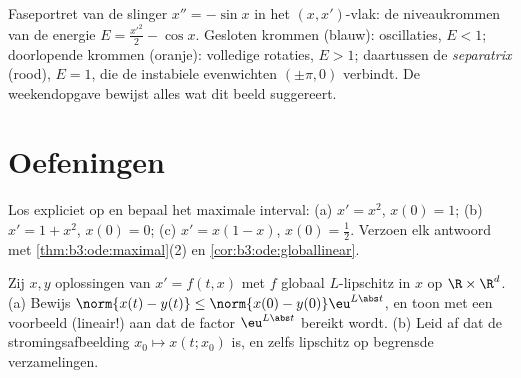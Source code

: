 \begin{omfigure}

{\small Faseportret van de slinger $x'' = -\sin x$ in het
$(x, x')$-vlak: de niveaukrommen van de energie $E = \frac{x'^2}2
- \cos x$. Gesloten krommen (blauw): oscillaties, $E < 1$;
doorlopende krommen (oranje): volledige rotaties, $E > 1$;
daartussen de \emph{separatrix} (rood), $E = 1$, die de
instabiele evenwichten $(\pm\pi, 0)$ verbindt. De weekendopgave
bewijst alles wat dit beeld suggereert.}
\end{omfigure}

\section{Oefeningen}

\begin{exercise}[$\star$]\label{exo:b3:ode:1}
Los expliciet op en bepaal het maximale interval:
(a) $x' = x^2$, $x(0) = 1$; (b) $x' = 1 + x^2$, $x(0) = 0$;
(c) $x' = x(1-x)$, $x(0) = \frac12$. Verzoen elk antwoord met
\cref{thm:b3:ode:maximal}(2) en
\cref{cor:b3:ode:globallinear}.
\end{exercise}

\begin{exercise}[$\star$]\label{exo:b3:ode:2}
Zij $x, y$ oplossingen van $x' = f(t,x)$ met $f$ globaal
$L$-lipschitz in $x$ op $\R\times\R^d$.
(a) Bewijs $\norm{x(t) - y(t)} \leq \norm{x(0) -
y(0)}\eu^{L\abs t}$, en toon met een voorbeeld (lineair!) aan dat
de factor $\eu^{L\abs t}$ bereikt wordt.
(b) Leid af dat de stromingsafbeelding $x_0 \mapsto x(t; x_0)$
 is, en zelfs lipschitz op begrensde verzamelingen.
\end{exercise}

